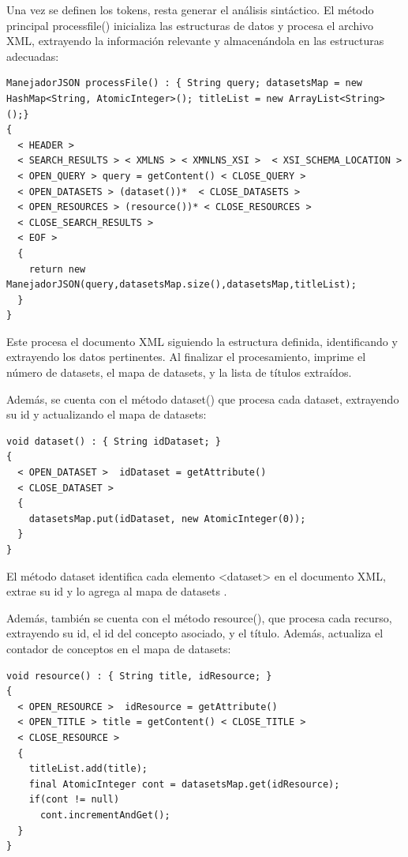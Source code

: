 Una vez se definen los tokens, resta generar el análisis sintáctico. El método principal processfile() inicializa las estructuras de datos y procesa el archivo XML, extrayendo la información relevante y almacenándola en las estructuras adecuadas:

\lstset{inputencoding=utf8/latin1}
\begin{lstlisting}
ManejadorJSON processFile() : { String query; datasetsMap = new HashMap<String, AtomicInteger>(); titleList = new ArrayList<String>();}
{
  < HEADER > 
  < SEARCH_RESULTS > < XMLNS > < XMNLNS_XSI >  < XSI_SCHEMA_LOCATION > 
  < OPEN_QUERY > query = getContent() < CLOSE_QUERY > 
  < OPEN_DATASETS > (dataset())*  < CLOSE_DATASETS >
  < OPEN_RESOURCES > (resource())* < CLOSE_RESOURCES >
  < CLOSE_SEARCH_RESULTS >
  < EOF >
  {
    return new ManejadorJSON(query,datasetsMap.size(),datasetsMap,titleList);
  }
}

\end{lstlisting}

Este procesa el documento XML siguiendo la estructura definida, identificando y extrayendo los datos pertinentes. Al finalizar el procesamiento, imprime el número de datasets, el mapa de datasets, y la lista de títulos extraídos.

Además, se cuenta con el método dataset() que procesa cada dataset, extrayendo su id y actualizando el mapa de datasets:


\lstset{inputencoding=utf8/latin1}
\begin{lstlisting}
void dataset() : { String idDataset; } 
{
  < OPEN_DATASET >  idDataset = getAttribute() 
  < CLOSE_DATASET >
  {
    datasetsMap.put(idDataset, new AtomicInteger(0));
  }
}
\end{lstlisting}

El método dataset identifica cada elemento <dataset> en el documento XML, extrae su id y lo agrega al mapa de datasets
.

Además, también se cuenta con el método resource(), que procesa cada recurso, extrayendo su id, el id del concepto asociado, y el título. Además, actualiza el contador de conceptos en el mapa de datasets:

\lstset{inputencoding=utf8/latin1}
\begin{lstlisting}
void resource() : { String title, idResource; } 
{
  < OPEN_RESOURCE >  idResource = getAttribute() 
  < OPEN_TITLE > title = getContent() < CLOSE_TITLE > 
  < CLOSE_RESOURCE >
  {
    titleList.add(title);
    final AtomicInteger cont = datasetsMap.get(idResource);
    if(cont != null)
      cont.incrementAndGet();
  }
}
\end{lstlisting}

